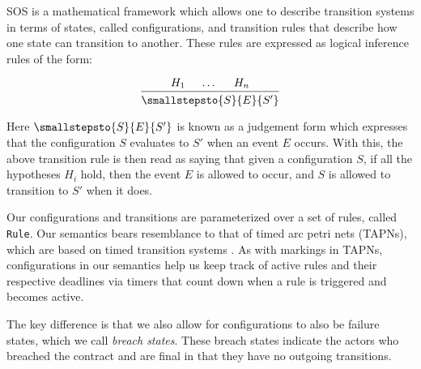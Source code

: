 \documentclass{article}
\begin{document}
SOS is a mathematical framework which allows one to describe
transition systems in terms of states, called configurations, and transition
rules that describe how one state can transition to another.
These rules are expressed as logical inference rules of the form:

\begin{align*}
  \begin{prooftree}
    \hypo{H_1}
    \hypo{\dots}
    \hypo{H_n}
    \infer3{\smallstepsto{S}{E}{S'}}
  \end{prooftree}
\end{align*}

Here $\smallstepsto{S}{E}{S'}$ is known as a judgement form which expresses that
the configuration $S$ evaluates to $S'$ when an event $E$ occurs.
With this, the above transition rule is then read as saying that given a
configuration $S$, if all the hypotheses $H_i$ hold, then the event $E$ is
allowed to occur, and $S$ is allowed to transition to $S'$ when it does.



Our configurations and transitions are parameterized over
a set of rules, called \texttt{Rule}.
Our semantics bears resemblance to that of timed arc petri nets (TAPNs), which
are based on timed transition systems .
As with markings in TAPNs, configurations in our semantics help us keep
track of active rules and their respective deadlines via timers that count down
when a rule is triggered and becomes active.

The key difference is that we also allow for configurations to also be failure
states, which we call \textit{breach states}.
These breach states indicate the actors who breached the contract and are final
in that they have no outgoing transitions.


\end{document}
